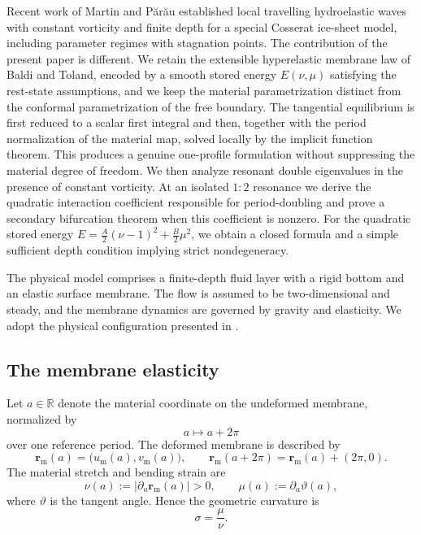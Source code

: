 \documentclass[12pt]{article}
\numberwithin{equation}{section}
\numberwithin{equation}{section}
\begin{document}
Recent work of Martin and P\u{a}r\u{a}u \cite{MartinParau2026} established local travelling hydroelastic waves with constant vorticity and finite depth for a special Cosserat ice-sheet model, including parameter regimes with stagnation points. The contribution of the present paper is different. We retain the extensible hyperelastic membrane law of Baldi and Toland, encoded by a smooth stored energy $E(\nu,\mu)$ satisfying the rest-state assumptions, and we keep the material parametrization distinct from the conformal parametrization of the free boundary. The tangential equilibrium is first reduced to a scalar first integral and then, together with the period normalization of the material map, solved locally by the implicit function theorem. This produces a genuine one-profile formulation without suppressing the material degree of freedom. We then analyze resonant double eigenvalues in the presence of constant vorticity. At an isolated $1{:}2$ resonance we derive the quadratic interaction coefficient responsible for period-doubling and prove a secondary bifurcation theorem when this coefficient is nonzero. For the quadratic stored energy $E=\frac A2(\nu-1)^2+\frac B2\mu^2$, we obtain a closed formula and a simple sufficient depth condition implying strict nondegeneracy.

The physical model comprises a finite-depth fluid layer with a rigid bottom and an elastic surface membrane. The flow is assumed to be two-dimensional and steady, and the membrane dynamics are governed by gravity and elasticity. We adopt the physical configuration presented in \cite{BaldiT,BaldiT1}.


\subsection{The membrane elasticity}

Let $a\in\mathbb R$ denote the material coordinate on the undeformed membrane, normalized by
\[
a\mapsto a+2\pi
\]
over one reference period.  The deformed membrane is described by
\begin{equation}\label{zy}
\mathbf r_{\mathrm m}(a)=\bigl(u_{\mathrm m}(a),v_{\mathrm m}(a)\bigr),
\qquad
\mathbf r_{\mathrm m}(a+2\pi)=\mathbf r_{\mathrm m}(a)+(2\pi,0).
\end{equation}
The material stretch and bending strain are
\begin{equation}\label{eq1.1}
\nu(a):=\left|\partial_a\mathbf r_{\mathrm m}(a)\right|>0,
\qquad
\mu(a):=\partial_a\vartheta(a),
\end{equation}
where $\vartheta$ is the tangent angle.  Hence the geometric curvature is
\begin{equation}\label{eq1.2}
\sigma=\frac{\mu}{\nu}.
\end{equation}
\end{document}
